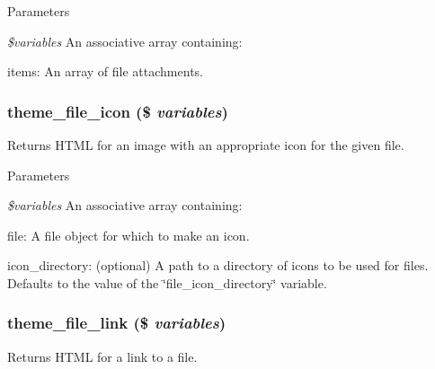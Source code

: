 \begin{DoxyParams}{Parameters}
\item[{\em \$variables}]An associative array containing:
\begin{DoxyItemize}
\item items: An array of file attachments. 
\end{DoxyItemize}\end{DoxyParams}
\hypertarget{group__themeable_ga7807f8ee7d081b9d1f7a9f96f7b0a52c}{
\subsubsection[{theme\_\-file\_\-icon}]{\setlength{\rightskip}{0pt plus 5cm}theme\_\-file\_\-icon (\$ {\em variables})}}
\label{group__themeable_ga7807f8ee7d081b9d1f7a9f96f7b0a52c}
Returns HTML for an image with an appropriate icon for the given file.


\begin{DoxyParams}{Parameters}
\item[{\em \$variables}]An associative array containing:
\begin{DoxyItemize}
\item file: A file object for which to make an icon.
\item icon\_\-directory: (optional) A path to a directory of icons to be used for files. Defaults to the value of the \char`\"{}file\_\-icon\_\-directory\char`\"{} variable. 
\end{DoxyItemize}\end{DoxyParams}
\hypertarget{group__themeable_ga09a17231e69397fafde06db8db4f476f}{
\subsubsection[{theme\_\-file\_\-link}]{\setlength{\rightskip}{0pt plus 5cm}theme\_\-file\_\-link (\$ {\em variables})}}
\label{group__themeable_ga09a17231e69397fafde06db8db4f476f}
Returns HTML for a link to a file.



